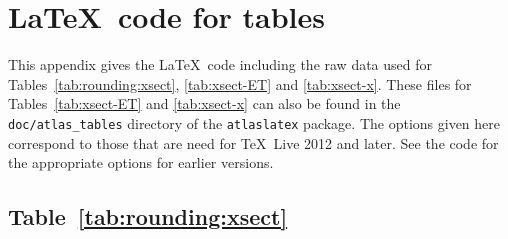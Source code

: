 \documentclass[UKenglish,texlive=2016]{\ATLASLATEXPATH atlasdoc}
\begin{document}
\appendix
\section{\LaTeX\ code for tables}
\label{sec:raw-data}

This appendix gives the \LaTeX\ code including the raw data used for
Tables~\ref{tab:rounding:xsect},
\ref{tab:xsect-ET} and \ref{tab:xsect-x}.
These files for Tables~\ref{tab:xsect-ET} and \ref{tab:xsect-x} can also be
found in the \texttt{doc/atlas\_tables} directory of the \texttt{atlaslatex} package.
The options given here correspond to those that are need for \TeX\ Live 2012 and later.
See the code for the appropriate options for earlier versions.

\subsection{Table~\protect\ref{tab:rounding:xsect}}
\end{document}
